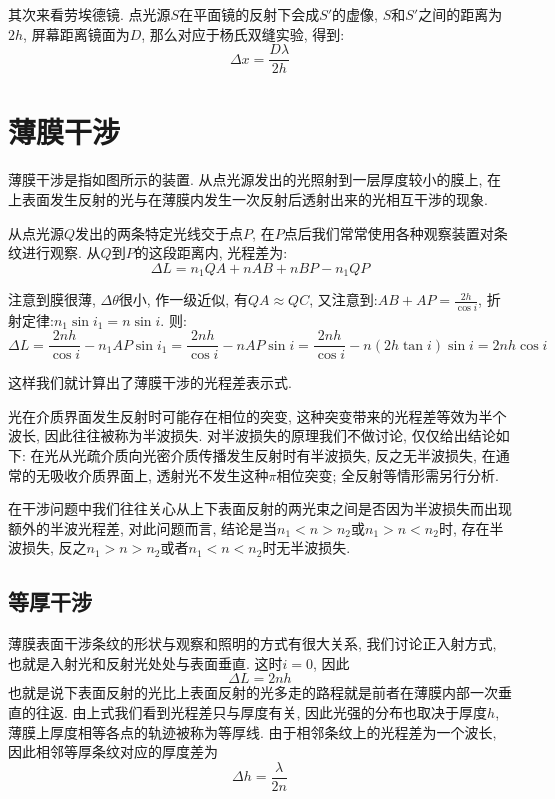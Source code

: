 其次来看劳埃德镜. 点光源$S$在平面镜的反射下会成$S'$的虚像, $S$和$S'$之间的距离为$2h$, 屏幕距离镜面为$D$, 那么对应于杨氏双缝实验, 得到:
\[
\Delta x = \frac{D\lambda}{2h}
\]


\section{薄膜干涉}

薄膜干涉是指如图所示的装置. 从点光源发出的光照射到一层厚度较小的膜上, 在上表面发生反射的光与在薄膜内发生一次反射后透射出来的光相互干涉的现象.


从点光源$Q$发出的两条特定光线交于点$P$, 在$P$点后我们常常使用各种观察装置对条纹进行观察. 从$Q$到$P$的这段距离内, 光程差为:
\[
\Delta L = n_1 QA +n AB +n BP - n_1 QP
\]

注意到膜很薄, $\Delta \theta$很小, 作一级近似, 有$QA\approx QC$, 又注意到:$AB+AP=\frac{2h}{\cos i}$, 折射定律:$n_1\sin i_1= n\sin i$.
则:
\[
\Delta L = \frac{2nh}{\cos i}-n_1AP\sin i_1 = \frac{2nh}{\cos i}-nAP\sin i = \frac{2nh}{\cos i}-n(2h\tan i)\sin i = 2nh\cos i
\]

这样我们就计算出了薄膜干涉的光程差表示式.

光在介质界面发生反射时可能存在相位的突变, 这种突变带来的光程差等效为半个波长, 因此往往被称为半波损失. 对半波损失的原理我们不做讨论, 仅仅给出结论如下: 在光从光疏介质向光密介质传播发生反射时有半波损失, 反之无半波损失, 在通常的无吸收介质界面上, 透射光不发生这种$\pi$相位突变; 全反射等情形需另行分析.

在干涉问题中我们往往关心从上下表面反射的两光束之间是否因为半波损失而出现额外的半波光程差, 对此问题而言, 结论是当$n_1<n>n_2$或$n_1>n<n_2$时, 存在半波损失, 反之$n_1>n>n_2$或者$n_1<n<n_2$时无半波损失.

\subsection{等厚干涉}

薄膜表面干涉条纹的形状与观察和照明的方式有很大关系, 我们讨论正入射方式, 也就是入射光和反射光处处与表面垂直. 这时$i=0$, 因此
\[
\Delta L = 2nh
\]
也就是说下表面反射的光比上表面反射的光多走的路程就是前者在薄膜内部一次垂直的往返. 由上式我们看到光程差只与厚度有关, 因此光强的分布也取决于厚度$h$, 薄膜上厚度相等各点的轨迹被称为等厚线. 由于相邻条纹上的光程差为一个波长, 因此相邻等厚条纹对应的厚度差为
\[
\Delta h = \frac{\lambda}{2n}
\]


